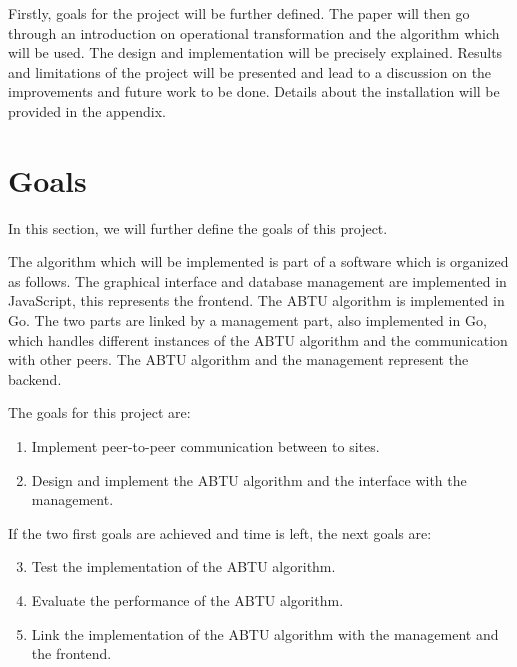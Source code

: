 \documentclass[11pt, a4paper, oneside, openright]{article} %
\begin{document}
Firstly, goals for the project will be further defined. The paper will then go through an introduction on operational transformation and the algorithm which will be used. The design and implementation will be precisely explained. Results and limitations of the project will be presented and lead to a discussion on the improvements and future work to be done. Details about the installation will be provided in the appendix.


\section{Goals}
\label{sec:motiv}

In this section, we will further define the goals of this project. 

The algorithm which will be implemented is part of a software which is organized as follows. The graphical interface and database management are implemented in JavaScript, this represents the frontend. The ABTU algorithm is implemented in Go. The two parts are linked by a management part, also implemented in Go, which handles different instances of the ABTU algorithm and the communication with other peers. The ABTU algorithm and the management represent the backend.

The goals for this project are:

\begin{enumerate}
	\item Implement peer-to-peer communication between to sites.
	\item Design and implement the ABTU algorithm and the interface with the management.
\end{enumerate}


If the two first goals are achieved and time is left, the next goals are:

\begin{enumerate}
	\setcounter{enumi}{2}
	\item Test the implementation of the ABTU algorithm.
	\item Evaluate the performance of the ABTU algorithm.
	\item Link the implementation of the ABTU algorithm with the management and the frontend.

\end{enumerate}

\end{document}

